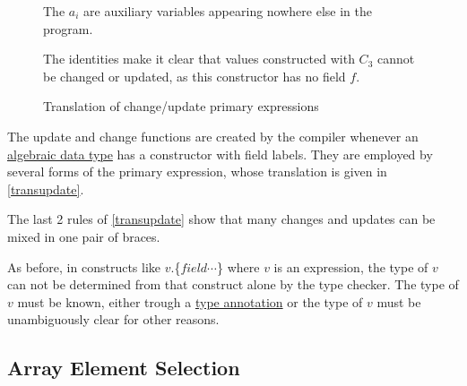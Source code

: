 \begin{figure}[hbt]
{    
\par The $a_i$ are auxiliary variables appearing nowhere else in the program. 
\par The identities make it clear that values constructed with $C_3$ cannot be changed or updated, as this constructor has no field $f$.
}
\caption{Translation of change/update primary expressions}
\label{transupdate}
\end{figure}

The update and change functions are created by the compiler whenever an \hyperref[algdcl]{algebraic data type} has a constructor with field labels. They are employed by several forms of the primary expression, whose translation is given in \autoref{transupdate}.

The last 2 rules of  \autoref{transupdate} show that many changes and updates can be mixed in one pair of braces. 

As before, in constructs like $v$.\{$field \cdots$\} where $v$ is an expression, the type of $v$ can not be determined from that construct alone by the type checker. The type of $v$ must be known, either trough a \hyperref[annotation]{type annotation} or the type of $v$ must be unambiguously clear for other reasons.  

\subsection{Array Element Selection} \label{arrayop}



